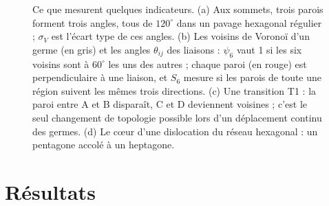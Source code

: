 \documentclass[10pt,a4paper]{article}
\begin{document}
\begin{figure}[H]
  \caption{Ce que mesurent quelques indicateurs. (a) Aux sommets, trois parois forment trois angles, tous de
    $120^\circ$ dans un pavage hexagonal régulier ; $\sigma_V$ est l'écart type de ces angles. (b) Les voisins de
    Voronoï d'un germe (en gris) et les angles $\theta_{ij}$ des liaisons : $\psi_6$ vaut 1 si les six voisins
    sont à $60^\circ$ les uns des autres ; chaque paroi (en rouge) est perpendiculaire à une liaison, et $S_6$
    mesure si les parois de toute une région suivent les mêmes trois directions. (c) Une transition T1 : la paroi
    entre A et B disparaît, C et D deviennent voisines ; c'est le seul changement de topologie possible lors d'un
    déplacement continu des germes. (d) Le cœur d'une dislocation du réseau hexagonal : un pentagone accolé à un
    heptagone.}
  \label{fig:schemas}
\end{figure}

\section{Résultats}
\end{document}
